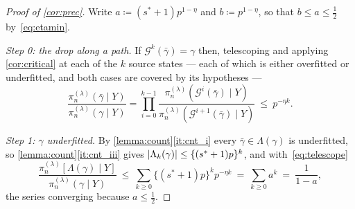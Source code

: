 \begin{proof}[Proof of \cref{cor:prec}]
    Write $a\coloneq(s^{\ast}+1)p^{1-\eta}$ and $b\coloneq p^{1-\eta}$,
    so that $b\leq a\leq\tfrac12$ by~\eqref{eq:etamin}.

    \emph{Step 0: the drop along a path.} If
    $\mathcal{G}^{k}(\bar\gamma)=\gamma$ then, telescoping and applying
    \cref{cor:critical} at each of the $k$ source states --- each of
    which is either overfitted or underfitted, and both cases are covered
    by its hypotheses ---
    \begin{equation}
        \label{eq:telescope}
        \frac{\pi_n^{(\lambda)}(\bar\gamma\mid Y)}
        {\pi_n^{(\lambda)}(\gamma\mid Y)}
        =\prod_{i=0}^{k-1}
        \frac{\pi_n^{(\lambda)}(\mathcal{G}^{i}(\bar\gamma)\mid Y)}
        {\pi_n^{(\lambda)}(\mathcal{G}^{i+1}(\bar\gamma)\mid Y)}
        \ \leq\ p^{-\eta k} .
    \end{equation}

    \emph{Step 1: $\gamma$ underfitted.} By
    \cref{lemma:count}\ref{it:cnt_i} every $\bar\gamma\in\Lambda(\gamma)$
    is underfitted, so \cref{lemma:count}\ref{it:cnt_iii} gives
    $\lvert\Lambda_k(\gamma)\rvert\leq\{(s^{\ast}+1)p\}^{k}$, and
    with~\eqref{eq:telescope}
    \begin{equation}
        \label{eq:precunder}
        \frac{\pi_n^{(\lambda)}[\Lambda(\gamma)\mid Y]}
        {\pi_n^{(\lambda)}(\gamma\mid Y)}
        \ \leq\ \sum_{k\geq0}\{(s^{\ast}+1)p\}^{k}p^{-\eta k}
        \ =\ \sum_{k\geq0}a^{k}\ =\ \frac{1}{1-a} ,
    \end{equation}
    the series converging because $a\leq\tfrac12$.


\end{proof}
